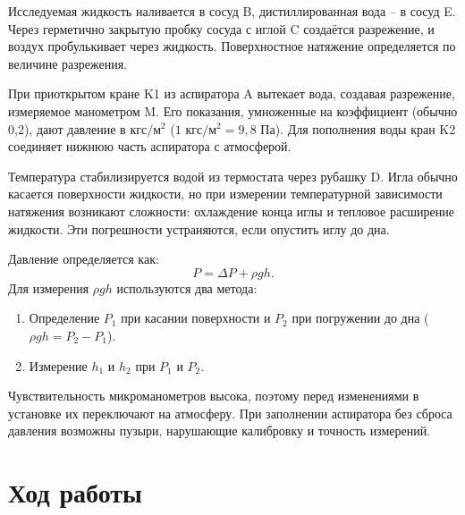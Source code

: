 \documentclass[a4paper,12pt]{article} %
\begin{document}
Исследуемая жидкость наливается в сосуд B, дистиллированная вода – в сосуд E. Через герметично закрытую пробку сосуда с иглой C создаётся разрежение, и воздух пробулькивает через жидкость. Поверхностное натяжение определяется по величине разрежения.

При приоткрытом кране K1 из аспиратора A вытекает вода, создавая разрежение, измеряемое манометром M. Его показания, умноженные на коэффициент (обычно 0,2), дают давление в $\text{кгс}/\text{м}^2$ ($1 \text{ кгс}/\text{м}^2 = 9{,}8 \text{ Па}$). Для пополнения воды кран K2 соединяет нижнюю часть аспиратора с атмосферой.

Температура стабилизируется водой из термостата через рубашку D. Игла обычно касается поверхности жидкости, но при измерении температурной зависимости натяжения возникают сложности: охлаждение конца иглы и тепловое расширение жидкости. Эти погрешности устраняются, если опустить иглу до дна.

Давление определяется как:
\[
P = \Delta P + \rho g h.
\]
Для измерения $\rho g h$ используются два метода:
\begin{enumerate}
    \item Определение $P_1$ при касании поверхности и $P_2$ при погружении до дна ($\rho g h = P_2 - P_1$).
    \item Измерение $h_1$ и $h_2$ при $P_1$ и $P_2$.
\end{enumerate}

Чувствительность микроманометров высока, поэтому перед изменениями в установке их переключают на атмосферу. При заполнении аспиратора без сброса давления возможны пузыри, нарушающие калибровку и точность измерений.



\section*{Ход работы}
\end{document}
